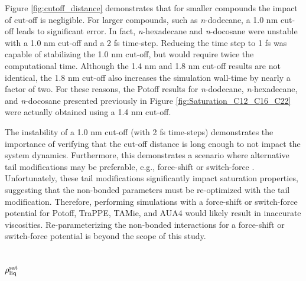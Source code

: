 \documentclass[preprint,review,12pt]{elsarticle}
\begin{document}
	Figure \ref{fig:cutoff_distance} demonstrates that for smaller compounds the impact of cut-off is negligible. For larger compounds, such as \textit{n}-dodecane, a 1.0 nm cut-off leads to significant error. In fact, \textit{n}-hexadecane and \textit{n}-docosane were unstable with a 1.0 nm cut-off and a 2 fs time-step. Reducing the time step to 1 fs was capable of stabilizing the 1.0 nm cut-off, but would require twice the computational time. Although the 1.4 nm and 1.8 nm cut-off results are not identical, the 1.8 nm cut-off also increases the simulation wall-time by nearly a factor of two. For these reasons, the Potoff results for \textit{n}-dodecane, \textit{n}-hexadecane, and \textit{n}-docosane presented previously in Figure \ref{fig:Saturation_C12_C16_C22} were actually obtained using a 1.4 nm cut-off.
	
	
	
	
	
	The instability of a 1.0 nm cut-off (with 2 fs time-steps) demonstrates the importance of verifying that the cut-off distance is long enough to not impact the system dynamics. Furthermore, this demonstrates a scenario where alternative tail modifications may be preferable, e.g., force-shift or switch-force \cite{GROMACS_2018}. Unfortunately, these tail modifications significantly impact saturation properties, suggesting that the non-bonded parameters must be re-optimized with the tail modification. Therefore, performing simulations with a force-shift or switch-force potential for Potoff, TraPPE, TAMie, and AUA4 would likely result in inaccurate viscosities. Re-parameterizing the non-bonded interactions for a force-shift or switch-force potential is beyond the scope of this study.
	
	\subsection{$\rho_{\rm liq}^{\rm sat}$}
	
\end{document}
